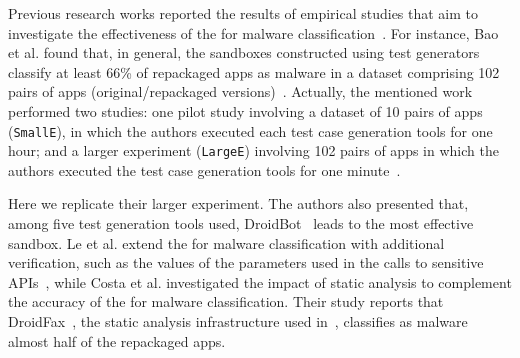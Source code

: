 






Previous research works reported the results of empirical studies that aim to investigate the effectiveness of
the \mas for malware classification~\cite{DBLP:conf/wcre/BaoLL18,DBLP:conf/scam/CostaMCMVBC20}.
For instance, Bao et al. found that, in general, the sandboxes constructed using test generators classify at least 66\% of repackaged apps as malware in a
dataset comprising 102 pairs of apps (original/repackaged versions)~\cite{DBLP:conf/wcre/BaoLL18}.
Actually, the mentioned work performed two studies: one pilot study involving a dataset
of 10 pairs of apps (\texttt{SmallE}), in which the authors executed each test case generation tools for one hour; and a larger experiment
(\texttt{LargeE}) involving 102 pairs of
apps in which the authors executed the test case generation tools for one minute~\cite{DBLP:conf/wcre/BaoLL18}.

Here we replicate their larger experiment. 
The authors also presented that, among five test generation tools used, DroidBot~\cite{DBLP:conf/icse/LiYGC17} leads to the most effective sandbox.
Le et al. extend the \mas for malware classification with additional verification,
such as the values of the parameters used in the
calls to sensitive APIs~\cite{le2018towards}, while
Costa et al.\cite{DBLP:journals/jss/CostaMMSSBNR22} investigated the impact of static analysis to complement the accuracy of the \mas
for malware classification. Their study reports that DroidFax~\cite{DBLP:conf/icsm/CaiR17a}, the static analysis infrastructure used in~\cite{DBLP:conf/wcre/BaoLL18}, classifies as malware almost half of the repackaged apps.







